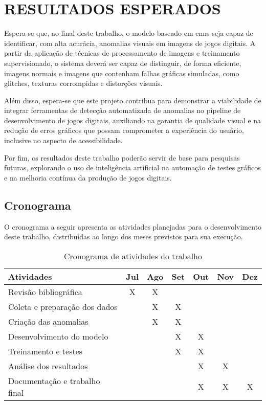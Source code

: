 \chapter{RESULTADOS ESPERADOS}

Espera-se que, ao final deste trabalho, o modelo baseado em \glspl{cnn} seja capaz de identificar, com alta acurácia, anomalias visuais em imagens de jogos digitais. A partir da aplicação de técnicas de processamento de imagens e treinamento supervisionado, o sistema deverá ser capaz de distinguir, de forma eficiente, imagens normais e imagens que contenham falhas gráficas simuladas, como glitches, texturas corrompidas e distorções visuais.

Além disso, espera-se que este projeto contribua para demonstrar a viabilidade de integrar ferramentas de detecção automatizada de anomalias no pipeline de desenvolvimento de jogos digitais, auxiliando na garantia de qualidade visual e na redução de erros gráficos que possam comprometer a experiência do usuário, inclusive no aspecto de acessibilidade.

Por fim, os resultados deste trabalho poderão servir de base para pesquisas futuras, explorando o uso de inteligência artificial na automação de testes gráficos e na melhoria contínua da produção de jogos digitais.

\section{Cronograma}

O cronograma a seguir apresenta as atividades planejadas para o desenvolvimento deste trabalho, distribuídas ao longo dos meses previstos para sua execução.

\begin{table}[H]
\centering
\caption{Cronograma de atividades do trabalho}
\begin{tabular}{|l|c|c|c|c|c|c|}
\hline
\textbf{Atividades} & \textbf{Jul} & \textbf{Ago} & \textbf{Set} & \textbf{Out} & \textbf{Nov} & \textbf{Dez} \\ \hline
Revisão bibliográfica         & X & X &   &   &   &   \\ \hline
Coleta e preparação dos dados &   & X & X &   &   &   \\ \hline
Criação das anomalias         &   & X & X &   &   &   \\ \hline
Desenvolvimento do modelo     &   &   & X & X &   &   \\ \hline
Treinamento e testes          &   &   & X & X &   &   \\ \hline
Análise dos resultados        &   &   &   & X & X &   \\ \hline
Documentação e trabalho final &   &   &   & X & X & X \\ \hline
\end{tabular}
\label{tab:cronograma}
\end{table}
